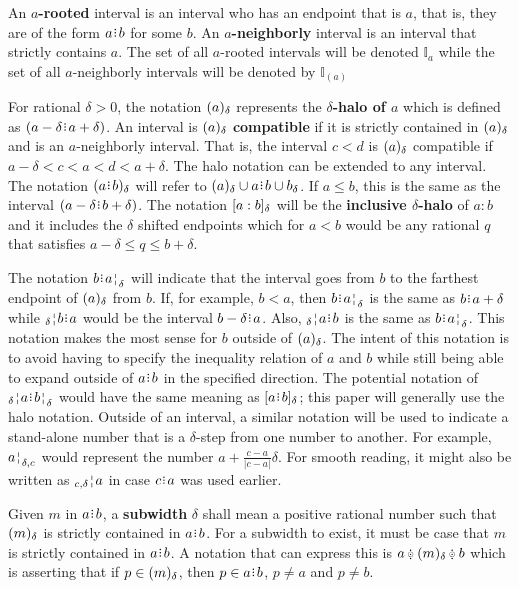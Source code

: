 \documentclass[12pt]{article}
\begin{document}
An \textbf{$a$-rooted} interval is an interval who has an endpoint that is $a$, that is, they are of the form $a\rint b$ for some $b$. An  \textbf{$a$-neighborly} interval is an interval that strictly contains $a$. The set of all $a$-rooted intervals will be denoted $\mathbb{I}_a$ while the set of all $a$-neighborly intervals will be denoted by $\mathbb{I}_{(a)}$

For rational $\delta > 0$, the notation $(a)_{\delta}$ represents the \textbf{$\delta$-halo of $a$} which is defined as $(a -\delta \rint  a+ \delta)$. An interval is $(a)_{\delta}$ \textbf{compatible }if it is strictly contained in $(a)_{\delta}$ and is an $a$-neighborly interval. That is, the interval $c \lt d$ is $(a)_{\delta}$ compatible if $a- \delta < c < a < d < a+ \delta$. The halo notation can be extended to any interval. The notation $\halo{a\rint b}$ will refer to $\halo{a} \cup a\rint b \cup b_\delta$. If $a \leq b$, this is the same as the interval $(a-\delta\rint b+\delta)$. The notation $[a:b]_{\delta}$ will be the \textbf{inclusive $\delta$-halo} of $a:b$ and it includes the $\delta$ shifted endpoints which for $a \lt b$ would be any rational $q$ that satisfies $a - \delta \leq q \leq b+ \delta$. 


The notation $b\rint \fuzbright{a}$ will indicate that the interval goes from $b$ to the farthest endpoint of $(a)_{\delta}$ from $b$. If, for example, $b < a$, then $b\rint \fuzbright{a}$ is the same as $b\rint a+\delta$ while $\fuzbleft{b} \rint a$ would be the interval $b-\delta\rint a$. Also, $\fuzbleft{a} \rint  b$ is the same as $b\rint \fuzbright{a}$. This notation makes the most sense for $b$ outside of $(a)_{\delta}$. The intent of this notation is to avoid having to specify the inequality relation of $a$ and $b$ while still being able to expand outside of $a\rint b$ in the specified direction. The potential notation of $\fuzbleft{a}\rint \fuzbright{b}$ would have the same meaning as $[a\rint b]_\delta$; this paper will generally use the halo notation. Outside of an interval, a similar notation will be used to indicate a stand-alone number that is a $\delta$-step from one number to another. For example, $\fuzbright[\delta,c]{a}$ would represent the number $a + \frac{c-a}{|c-a|}\delta$. For smooth reading, it might also be written as $\fuzbleft[c, \delta]{a}$ in case $c \rint a$ was used earlier. 

Given $m$ in $a \rint  b$, a \textbf{subwidth} $\delta$ shall mean a positive rational number such that $(m)_{\delta}$ is strictly contained in $a\rint b$. For a subwidth to exist, it must be case that $m$ is strictly contained in $a\rint b$. A notation that can express this is $a \betneq \halo{m} \betneq b$ which is asserting that if $p \in (m)_{\delta}$, then $p \in a\rint b$, $p \neq a$ and $p \neq b$. 
\end{document}
